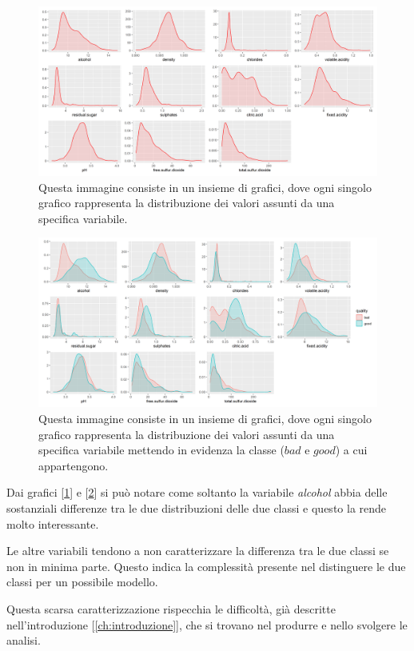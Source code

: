 \begin{figure}[H]
    \centering
    \includegraphics[width=\linewidth]{images/analisi/distribuzioni_variabili/distribution1.png}
    \caption{Questa immagine consiste in un insieme di grafici, dove ogni singolo grafico rappresenta la distribuzione dei valori assunti da una specifica variabile.}
    \label{fig:distrubution_1}
\end{figure}

\begin{figure}[H]
    \centering
    \includegraphics[width=\linewidth]{images/analisi/distribuzioni_variabili/distribution2.png}
    \caption{Questa immagine consiste in un insieme di grafici, dove ogni singolo grafico rappresenta la distribuzione dei valori assunti da una specifica variabile mettendo in evidenza la classe ($bad$ e $good$) a cui appartengono.}
    \label{fig:distrubution_2}
\end{figure}

\noindent
Dai grafici [\ref{fig:distrubution_1}] e [\ref{fig:distrubution_2}] si può notare come soltanto la variabile \textit{alcohol} abbia delle sostanziali differenze tra le due distribuzioni delle due classi e questo la rende molto interessante.

\newpage

\noindent
Le altre variabili tendono a non caratterizzare la differenza tra le due classi se non in minima parte. Questo indica la complessità presente nel distinguere le due classi per un possibile modello.

\noindent
Questa scarsa caratterizzazione rispecchia le difficoltà, già descritte nell'introduzione [\ref{ch:introduzione}], che si trovano nel produrre e nello svolgere le analisi.
